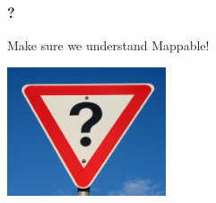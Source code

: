 \begin{frame}[fragile]
\frametitle{?}
\begin{center}
Make sure we understand Mappable!
\end{center}
\begin{center}
\includegraphics[height=3.8cm]{image/Question_mark_road_sign,_Australia.jpg}
\end{center}
\end{frame}

